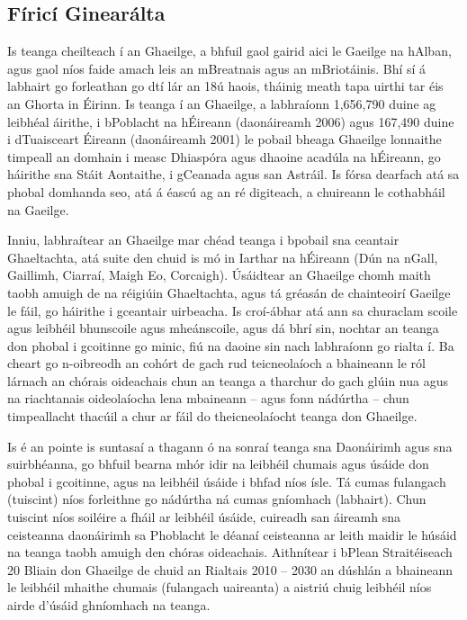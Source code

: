 \clearpage


\label{IrishInfso_ga}

\begin{multicols}{2}

\subsection{Fíricí Ginearálta}

Is teanga cheilteach í an Ghaeilge, a bhfuil gaol gairid aici le Gaeilge na hAlban, agus gaol níos faide amach leis an mBreatnais agus an mBriotáinis. Bhí sí á labhairt go forleathan go dtí lár an 18ú haois, tháinig meath tapa uirthi tar éis an Ghorta in Éirinn. Is teanga í an Ghaeilge, a labhraíonn 1,656,790 duine ag leibhéal áirithe, i bPoblacht na hÉireann (daonáireamh 2006) agus 167,490 duine i dTuaisceart Éireann (daonáireamh 2001) le pobail bheaga Ghaeilge lonnaithe timpeall an domhain i measc Dhiaspóra agus dhaoine acadúla na hÉireann, go háirithe sna Stáit Aontaithe, i gCeanada agus san Astráil. Is fórsa dearfach atá sa phobal domhanda seo, atá á éascú ag an ré digiteach, a chuireann le cothabháil na Gaeilge.

Inniu, labhraítear an Ghaeilge mar chéad teanga i bpobail sna ceantair Ghaeltachta, atá suite den chuid is mó in Iarthar na hÉireann (Dún na nGall, Gaillimh, Ciarraí, Maigh Eo, Corcaigh). Úsáidtear an Ghaeilge chomh maith taobh amuigh de na réigiúin Ghaeltachta, agus tá gréasán de chainteoirí Gaeilge le fáil, go háirithe i gceantair uirbeacha.   Is croí-ábhar atá ann sa churaclam scoile agus leibhéil bhunscoile agus mheánscoile, agus dá bhrí sin, nochtar an teanga don phobal i gcoitinne go minic, fiú na daoine sin nach labhraíonn go rialta í. Ba cheart go n-oibreodh an cohórt de gach rud teicneolaíoch a bhaineann le ról lárnach an chórais oideachais chun an teanga a tharchur do gach glúin nua \cite{oriagain97} agus na riachtanais oideolaíocha lena mbaineann – agus fonn nádúrtha – chun timpeallacht thacúil a chur ar fáil do theicneolaíocht teanga don Ghaeilge.

Is é an pointe is suntasaí a thagann ó na sonraí teanga sna Daonáirimh agus sna suirbhéanna, go bhfuil bearna mhór idir na leibhéil chumais agus úsáide don phobal i gcoitinne, agus na leibhéil úsáide i bhfad níos ísle. Tá cumas fulangach (tuiscint) níos forleithne go nádúrtha ná cumas gníomhach (labhairt). Chun tuiscint níos soiléire a fháil ar leibhéil úsáide, cuireadh san áireamh sna ceisteanna daonáirimh sa Phoblacht le déanaí ceisteanna ar leith maidir le húsáid na teanga taobh amuigh den chóras oideachais. Aithnítear i bPlean Straitéiseach 20 Bliain don Ghaeilge de chuid an Rialtais 2010 -- 2030 an dúshlán a bhaineann le leibhéil mhaithe chumais (fulangach uaireanta) a aistriú chuig leibhéil níos airde d’úsáid ghníomhach na teanga.


\end{multicols}
